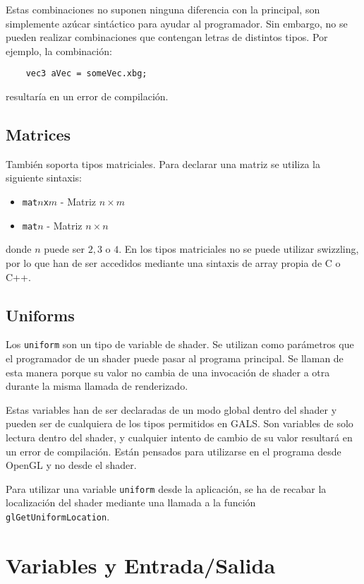 Estas combinaciones no suponen ninguna diferencia con la principal, son
simplemente azúcar sintáctico para ayudar al programador. Sin embargo, no se
pueden realizar combinaciones que contengan letras de distintos tipos. Por
ejemplo, la combinación: 
\begin{verbatim}
    vec3 aVec = someVec.xbg;
\end{verbatim}
resultaría en un error de compilación.

\subsection{Matrices}

También soporta tipos matriciales. Para declarar una matriz se utiliza la
siguiente sintaxis:

\begin{itemize}
		\item \verb|mat|$n$\verb|x|$m$ - Matriz $n \times m$
		\item \verb|mat|$n$ - Matriz $n \times n$
\end{itemize}	
donde $n$ puede ser $2, 3$ o $4$. En los tipos matriciales no se puede utilizar
swizzling, por lo que han de ser accedidos mediante una sintaxis de array propia
de C o C++.

\subsection{Uniforms}

Los \verb|uniform| son un tipo de variable de shader. Se utilizan como
parámetros que el programador de un shader puede pasar al programa principal. Se
llaman de esta manera porque su valor no cambia de una invocación de shader a
otra durante la misma llamada de renderizado. 

Estas variables han de ser declaradas de un modo global dentro del shader y
pueden ser de cualquiera  de los tipos permitidos en GALS. Son variables  de
solo lectura dentro del shader, y cualquier intento de cambio de su valor
resultará en un error de compilación. Están pensados para utilizarse en el
programa desde OpenGL y no desde el shader.

Para utilizar una variable \verb|uniform| desde la aplicación, se ha de recabar
la localización del shader mediante una llamada a la función
\verb|glGetUniformLocation|.

\section{Variables y Entrada/Salida}

